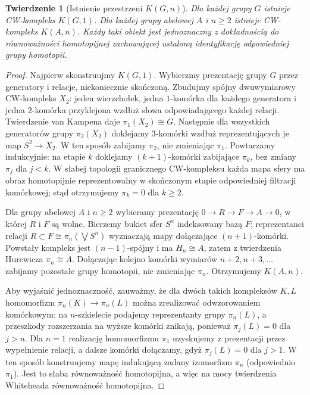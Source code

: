 \documentclass[11pt,a4paper,oneside]{report}
\theoremstyle{plain}
\newtheorem{twierdzenie}{Twierdzenie}[section]
\theoremstyle{definition}
\theoremstyle{remark}
\begin{document}
\begin{twierdzenie}[Istnienie przestrzeni $K(G,n)$]
\label{thm:KGn-existence-v6}
Dla każdej grupy $G$ istnieje CW-kompleks $K(G,1)$.
Dla każdej grupy abelowej $A$ i $n\ge2$ istnieje
CW-kompleks $K(A,n)$. Każdy taki obiekt jest jednoznaczny
z dokładnością do równoważności homotopijnej zachowującej
ustaloną identyfikację odpowiedniej grupy homotopii.
\end{twierdzenie}
\begin{proof}
Najpierw skonstruujmy $K(G,1)$. Wybierzmy prezentację
grupy $G$ przez generatory i relacje, niekoniecznie skończoną.
Zbudujmy spójny dwuwymiarowy CW-kompleks $X_2$:
jeden wierzchołek, jedna $1$-komórka dla każdego generatora
i jedna $2$-komórka przyklejona wzdłuż słowa odpowiadającego
każdej relacji. Twierdzenie van Kampena daje $\pi_1(X_2)\cong G$.
Następnie dla wszystkich generatorów grupy $\pi_2(X_2)$
doklejamy $3$-komórki wzdłuż reprezentujących je map
$S^2\to X_2$. W ten sposób zabijamy $\pi_2$, nie zmieniając
$\pi_1$. Powtarzamy indukcyjnie: na etapie $k$ doklejamy
$(k+1)$-komórki zabijające $\pi_k$, bez zmiany $\pi_j$
dla $j<k$. W słabej topologii granicznego CW-kompleksu
każda mapa sfery ma obraz homotopijnie reprezentowalny
w skończonym etapie odpowiedniej filtracji komórkowej;
stąd otrzymujemy $\pi_k=0$ dla $k\ge2$.

Dla grupy abelowej $A$ i $n\ge2$ wybieramy prezentację
$0\to R\to F\to A\to0$, w której $R$ i $F$ są wolne.
Bierzemy bukiet sfer $S^n$ indeksowany bazą $F$;
reprezentanci relacji $R\subset F\cong\pi_n(\bigvee S^n)$
wyznaczają mapy dołączające $(n+1)$-komórki.
Powstały kompleks jest $(n-1)$-spójny i ma
$H_n\cong A$, zatem z twierdzenia Hurewicza
$\pi_n\cong A$. Dołączając kolejno komórki wymiarów
$n+2,n+3,\ldots$ zabijamy pozostałe grupy homotopii,
nie zmieniając $\pi_n$. Otrzymujemy $K(A,n)$.

Aby wyjaśnić jednoznaczność, zauważmy, że dla dwóch takich
kompleksów $K,L$ homomorfizm $\pi_n(K)\to\pi_n(L)$
można zrealizować odwzorowaniem komórkowym: na
$n$-szkielecie podajemy reprezentanty grupy $\pi_n(L)$,
a przeszkody rozszerzania na wyższe komórki znikają,
ponieważ $\pi_j(L)=0$ dla $j>n$. Dla $n=1$ realizację
homomorfizmu $\pi_1$ uzyskujemy z prezentacji przez
wypełnienie relacji, a dalsze komórki dołączamy, gdyż
$\pi_j(L)=0$ dla $j>1$. W ten sposób konstruujemy mapę
indukującą zadany izomorfizm $\pi_n$ (odpowiednio $\pi_1$).
Jest to słaba równoważność homotopijna, a więc na mocy
twierdzenia Whiteheada równoważność homotopijna.
\end{proof}
\end{document}
